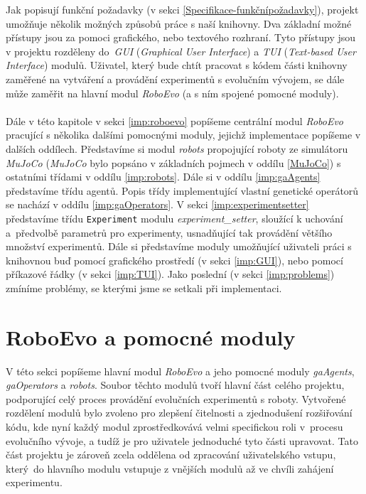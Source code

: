 Jak popisují funkční požadavky (v sekci \ref{Specifikace-funkčnípožadavky}),
projekt umožňuje několik možných způsobů práce s naší knihovny. Dva základní
možné přístupy jsou za pomoci grafického, nebo textového rozhraní. Tyto
přístupy jsou v projektu rozděleny do~\emph{GUI} (\emph{Graphical User
Interface}) a \emph{TUI} (\emph{Text-based User Interface}) modulů. Uživatel,
který bude chtít pracovat s kódem části knihovny zaměřené na vytváření a
provádění experimentů s evolučním vývojem, se dále může zaměřit na hlavní modul
\emph{RoboEvo} (a s ním spojené pomocné moduly).

\paragraph{} 
Dále v této kapitole v sekci \ref{imp:roboevo} popíšeme centrální modul
\emph{RoboEvo} pracující s několika dalšími pomocnými moduly, jejichž
implementace popíšeme v dalších oddílech. Představíme si modul \emph{robots}
propojující roboty ze simulátoru \emph{MuJoCo} (\emph{MuJoCo} bylo popsáno v
základních pojmech v oddílu \ref{MuJoCo}) s ostatními třídami v oddílu
\ref{imp:robots}. Dále si v oddílu \ref{imp:gaAgents} představíme třídu agentů.
Popis třídy implementující vlastní genetické operátorů se nachází v oddílu
\ref{imp:gaOperators}. V sekci \ref{imp:experimentsetter} představíme třídu
\texttt{Experiment} modulu \emph{experiment\_setter}, sloužící k uchování
a~předvolbě parametrů pro experimenty, usnadňující tak provádění většího
množství experimentů. Dále si představíme moduly umožňující uživateli
práci s knihovnou buď pomocí grafického prostředí (v sekci \ref{imp:GUI}), nebo
pomocí příkazové řádky (v sekci \ref{imp:TUI}). Jako poslední (v sekci
\ref{imp:problems}) zmíníme problémy, se kterými jsme se setkali při
implementaci.

\section{RoboEvo a pomocné moduly}
V této sekci popíšeme hlavní modul \emph{RoboEvo} a jeho pomocné moduly
\emph{gaAgents}, \emph{gaOperators} a \emph{robots}. Soubor těchto modulů tvoří
hlavní část celého projektu, podporující celý proces provádění evolučních
experimentů s roboty. Vytvořené rozdělení modulů bylo zvoleno pro zlepšení
čitelnosti a zjednodušení rozšiřování kódu, kde nyní každý modul
zprostředkovává velmi specifickou roli v~procesu evolučního vývoje, a tudíž je
pro uživatele jednoduché tyto části upravovat. Tato část projektu je zároveň
zcela oddělena od zpracování uživatelského vstupu, který~do hlavního modulu
vstupuje z vnějších modulů až ve chvíli zahájení experimentu. 

